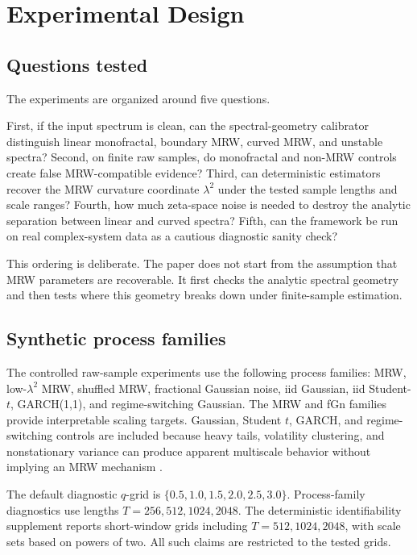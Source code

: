 \section{Experimental Design}

\subsection{Questions tested}

The experiments are organized around five questions.

First, if the input spectrum is clean, can the spectral-geometry calibrator
distinguish linear monofractal, boundary MRW, curved MRW, and unstable spectra?
Second, on finite raw samples, do monofractal and non-MRW controls create false
MRW-compatible evidence? Third, can deterministic estimators recover the MRW
curvature coordinate \(\lambda^2\) under the tested sample lengths and scale
ranges? Fourth, how much zeta-space noise is needed to destroy the analytic
separation between linear and curved spectra? Fifth, can the framework be run
on real complex-system data as a cautious diagnostic sanity check?

This ordering is deliberate. The paper does not start from the assumption that
MRW parameters are recoverable. It first checks the analytic spectral
geometry and then tests where this geometry breaks down under finite-sample
estimation.

\subsection{Synthetic process families}

The controlled raw-sample experiments use the following process families:
MRW, low-\(\lambda^2\) MRW, shuffled MRW, fractional Gaussian noise, iid
Gaussian, iid Student-\(t\), GARCH(1,1), and regime-switching Gaussian. The
MRW and fGn families provide interpretable scaling targets. Gaussian, Student
\(t\), GARCH, and regime-switching controls are included because heavy tails,
volatility clustering, and nonstationary variance can produce apparent
multiscale behavior without implying an MRW mechanism
\cite{bollerslev1986garch,hamilton1989regime}.

The default diagnostic \(q\)-grid is
\(\{0.5,1.0,1.5,2.0,2.5,3.0\}\). Process-family diagnostics use lengths
\(T=256,512,1024,2048\). The deterministic identifiability supplement reports
short-window grids including \(T=512,1024,2048\), with scale sets based on
powers of two. All such claims are restricted to the tested grids.

